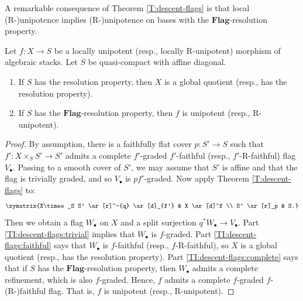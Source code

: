\documentclass[reqno,a4paper]{amsart}
\numberwithin{Theorem}{section}
\newcommand{\Flag}{\mathbf{Flag}}
\theoremstyle{plain}
\theoremstyle{remark}
\begin{document}
A remarkable consequence of Theorem \ref{T:descent-flags} is
that local (R-)unipotence implies (R-)unipotence on bases with the
$\Flag$-resolution property.
\begin{Theorem}\label{T:flat-local-unipotent-morphism}
  Let $f\colon X \to S$ be a locally unipotent (resp., locally R-unipotent)
  morphism of algebraic stacks. Let $S$ be quasi-compact with affine
  diagonal.
  \begin{enumerate}
  \item If $S$ has the resolution property, then $X$ is a global quotient
    (resp., has the resolution property).
  \item If $S$ has the $\Flag$-resolution property, then $f$ is unipotent (resp., R-unipotent). 
\end{enumerate}
\end{Theorem}
\begin{proof}
  By assumption, there is a faithfully flat cover $p \colon S' \to S$
  such that $f' \colon X\times_S S' \to S'$ admits a complete $f'$-graded
  $f'$-faithful (resp., $f'$-R-faithful) flag $V_\bullet$.  Passing to a smooth cover of $S'$,
  we may assume that $S'$ is affine and that the flag is trivially graded, and so $V_\bullet$ is
  $pf'$-graded. Now apply Theorem \ref{T:descent-flags} to:
  \[
    \xymatrix{X\times_S S' \ar[r]^-{q} \ar[d]_{f'} & X \ar[d]^f
        \\ S' \ar[r]_p & S.} 
  \]
  Then we obtain a flag $W_\bullet$ on $X$ and a split surjection
  $q^*W_\bullet \to V_\bullet$. Part \ref{TI:descent-flags:trivial}
  implies that $W_\bullet$ is $f$-graded. Part
  \ref{TI:descent-flags:faithful} says that $W_\bullet$ is
  $f$-faithful (resp., $f$-R-faithful), so $X$ is a global quotient (resp., has the resolution
  property). Part \ref{TI:descent-flags:complete} says that if $S$ has the
  $\Flag$-resolution property, then $W_\bullet$ admits a complete
  refinement, which is also $f$-graded. Hence, $f$ admits a complete
  $f$-graded $f$-(R-)faithful flag. That is, $f$ is unipotent (resp., R-unipotent).
\end{proof}
\end{document}
